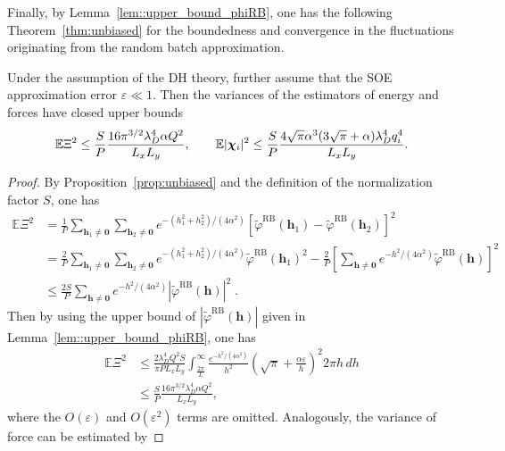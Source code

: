 Finally, by Lemma~\ref{lem::upper_bound_phiRB}, one has the following Theorem~\ref{thm:unbiased} for the boundedness and convergence in the fluctuations originating from the random batch approximation.
\begin{thm}\label{thm:unbiased}
	Under the assumption of the DH theory, further assume that the SOE approximation error $\varepsilon\ll 1$. 
	Then the variances of the estimators of energy and forces have closed upper bounds
	\begin{equation}
		\mathbb{E}\Xi^2\leq \frac{S}{P}\frac{16\pi^{3/2}\lambda_D^4\alpha Q^2}{L_xL_y},\quad \quad \mathbb{E}|\boldsymbol{\chi}_{i}|^2\leq\frac{S}{P}\frac{4\sqrt{\pi}\alpha^3(3\sqrt{\pi}+\alpha)\lambda_D^4 q_{i}^4}{L_xL_y}.
	\end{equation}
\end{thm}
\begin{proof}
	By Proposition~\ref{prop:unbiased} and the definition of the normalization factor $S$, one has
	\begin{equation}
		\begin{split}
			\mathbb{E}\Xi^2
			& = \frac{1}{P}\sum_{\bm{h}_1\neq \bm{0}}\sum_{\bm{h}_2\neq \bm{0}}e^{-(h_1^2+h_2^2)/(4\alpha^2)}\left[\widetilde{\varphi}^{\text{RB}}(\bm{h}_1)-\widetilde{\varphi}^{\text{RB}}(\bm{h}_2)\right]^2\\
			& = \frac{2}{P}\sum_{\bm{h}_1\neq \bm{0}}\sum_{\bm{h}_2\neq \bm{0}}e^{-(h_1^2+h_2^2)/(4\alpha^2)} \widetilde{\varphi}^{\text{RB}}(\bm{h}_1)^2 - \frac{2}{P} \left[ \sum_{\bm{h}\neq \bm{0}} e^{-h^2 /(4\alpha^2)} \widetilde{\varphi}^{\text{RB}}(\bm{h}) \right]^2\\
			& \leq \frac{2S}{P}\sum_{\bm{h}\neq\bm{0}}e^{-h^2/(4\alpha^2)}\left|\widetilde{\varphi}^{\text{RB}}(\bm{h})\right|^2\;.
		\end{split}
	\end{equation}
	Then by using the upper bound of $\left|\widetilde{\varphi}^{\text{RB}}(\bm{h})\right|$ given in Lemma~\ref{lem::upper_bound_phiRB}, one has 
	\begin{equation}
		\begin{split}
			\mathbb{E}\Xi^2&\leq \frac{2\lambda_D^4Q^2S}{\pi PL_xL_y}\int_{\frac{2\pi}{L}}^{\infty}\frac{e^{-h^2/(4\alpha^2)}}{h^2}\left(\sqrt{\pi}+\frac{\alpha \varepsilon}{h}\right)^2 2\pi h\,dh\\
			&\leq \frac{S}{P}\frac{16\pi^{3/2}\lambda_D^4\alpha Q^2}{L_xL_y},
		\end{split}
	\end{equation}
	where the $O(\varepsilon)$ and $O(\varepsilon^2)$ terms are omitted. Analogously, the variance of force can be estimated by

\end{proof}
